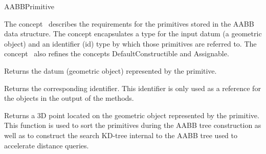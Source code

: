 \ccRefPageBegin


\begin{ccRefConcept}{AABBPrimitive}


\ccDefinition
  
The concept \ccRefName\ describes the requirements for the primitives stored in the AABB data structure. The concept encapsulates a type for the input datum (a geometric object) and an identifier (id) type by which those primitives are referred to. The concept \ccRefName\ also refines the concepts DefaultConstructible and Assignable.

\ccTypes






\ccOperations

{Returns the datum (geometric object) represented by the primitive.}

{Returns the corresponding identifier. This identifier is only used as a reference for the objects in the output of the  methods.}

{Returns a 3D point located on the geometric object represented by the primitive. This function is used to sort the primitives during the AABB tree construction as well as to construct the search KD-tree internal to the AABB tree used to accelerate distance queries.}

\ccSeeAlso
{}


\end{ccRefConcept}
